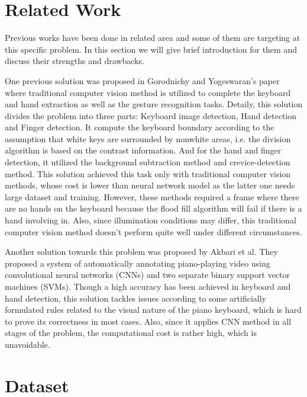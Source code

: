 \documentclass[10pt,twocolumn,letterpaper]{article}
\begin{document}
\section{Related Work}
   Previous works have been done in related area and some of them are targeting at this specific problem. In this section we will give brief introduction for them and discuss their strengths and drawbacks.

   One previous solution was proposed in Gorodnichy and Yogeswaran's paper \cite{gorodnichy2006detection} where traditional computer vision method is utilized to complete the keyboard and hand extraction as well as the gesture recognition tasks.
   Detaily, this solution divides the problem into three parts: Keyboard image detection, Hand detection and Finger detection. 
   It compute the keyboard boundary according to the assumption that white keys are surrounded by nonwhite areas, i.e. the division algorithm is based on the contrast information.
   And for the hand and finger detection, it utilized the background subtraction method and crevice-detection method.
   This solution achieved this task only with traditional computer vision methods, whose cost is lower than neural network model as the latter one needs large dataset and training.
   However, these methods required a frame where there are no hands on the keyboard because the flood fill algorithm will fail if there is a hand involving in.
   Also, since illumination conditions may differ, this traditional computer vision method doesn't perform quite well under different circumstances.

   Another solution towards this problem was proposed by Akbari et al. \cite{Akbari} 
   They proposed a system of automatically annotating piano-playing video using convolutional neural networks (CNNs) and two separate binary support vector machines (SVMs).
   Though a high accuracy has been achieved in keyboard and hand detection, this solution tackles issues according to some artificially formulated rules related to the visual nature of the piano keyboard, which is hard to prove its correctness in most cases.
   Also, since it applies CNN method in all stages of the problem, the computational cost is rather high, which is unavoidable.

\section{Dataset}
\end{document}
